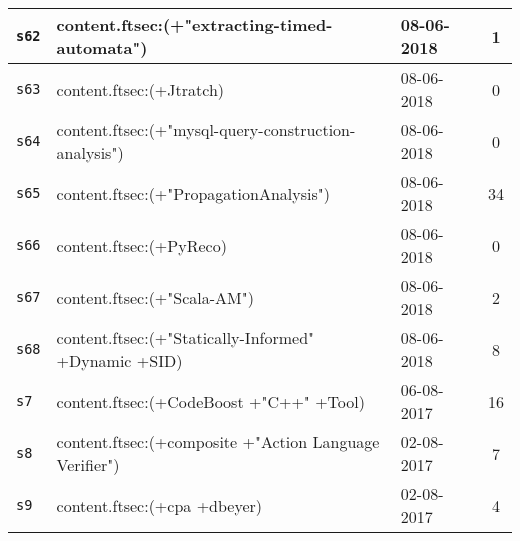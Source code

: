 \begin{longtable}{| l | p{13cm} | l | c |}
    \hline
\texttt{s62} & content.ftsec:(+"extracting-timed-automata") & 08-06-2018 & 1 \\
    \hline
\texttt{s63} & content.ftsec:(+Jtratch) & 08-06-2018 & 0 \\
    \hline
\texttt{s64} & content.ftsec:(+"mysql-query-construction-analysis") & 08-06-2018 & 0 \\
    \hline
\texttt{s65} & content.ftsec:(+"PropagationAnalysis") & 08-06-2018 & 34 \\
    \hline
\texttt{s66} & content.ftsec:(+PyReco) & 08-06-2018 & 0 \\
    \hline
\texttt{s67} & content.ftsec:(+"Scala-AM") & 08-06-2018 & 2 \\
    \hline
\texttt{s68} & content.ftsec:(+"Statically-Informed" +Dynamic +SID) & 08-06-2018 & 8 \\
    \hline
\texttt{s7} & content.ftsec:(+CodeBoost +"C++" +Tool) & 06-08-2017 & 16 \\
    \hline
\texttt{s8} & content.ftsec:(+composite +"Action Language Verifier") & 02-08-2017 & 7 \\
    \hline
\texttt{s9} & content.ftsec:(+cpa +dbeyer) & 02-08-2017 & 4 \\
    \hline
  \hline
\end{longtable}

